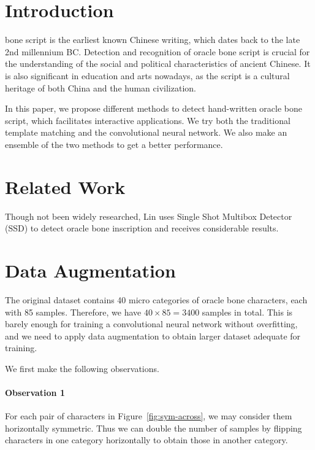 \documentclass[journal]{IEEEtran}
\begin{document}
\IEEEpeerreviewmaketitle



\section{Introduction}
 bone script is the earliest known Chinese writing, which dates back to the late 2nd millennium BC. Detection and recognition of oracle bone script is crucial for the understanding of the social and political characteristics of ancient Chinese. It is also significant in education and arts nowadays, as the script is a cultural heritage of both China and the human civilization.

In this paper, we propose different methods to detect hand-written oracle bone script, which facilitates interactive applications. We try both the traditional template matching and the convolutional neural network. We also make an ensemble of the two methods to get a better performance.

\section{Related Work}
Though not been widely researched, Lin \cite{ssd} uses Single Shot Multibox Detector (SSD) to detect oracle bone inscription and receives considerable results.


\section{Data Augmentation}
The original dataset contains 40 micro categories of oracle bone characters, each with 85 samples.
Therefore, we have $40 \times 85 = 3400$ samples in total.
This is barely enough for training a convolutional neural network without overfitting, and we need to apply data augmentation to obtain larger dataset adequate for training.

We first make the following observations.

\paragraph{Observation 1} For each pair of characters in Figure~\ref{fig:sym-across}, we may consider them horizontally symmetric.
Thus we can double the number of samples by flipping characters in one category horizontally to obtain those in another category.
\end{document}
